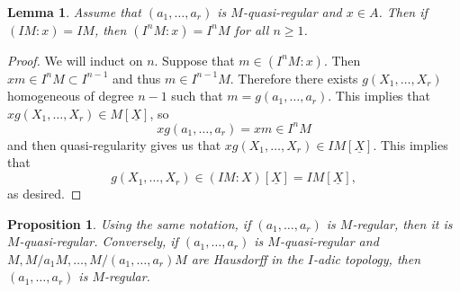 \documentclass[leqno, openany]{memoir}
\newtheorem{prop}[thm]{Proposition}
\newtheorem{lem}[thm]{Lemma}
\theoremstyle{definition}
\theoremstyle{remark}
\theoremstyle{plain}
\theoremstyle{definition}
\theoremstyle{remark}
\newcommand{\ul}[1]{\underline{#1}}
\begin{document}
\begin{lem} Assume that $(a_1, \ldots, a_r)$ is $M$-quasi-regular and $x \in
A$. Then if $(IM : x) = IM$, then $(I^n M : x) = I^n M$ for all $n \geq 1$.
\end{lem}

\begin{proof} We will induct on $n$. Suppose that $m \in (I^n M : x)$. Then $xm
    \in I^n M \subset I^{n-1}$ and thus $m \in I^{n-1}M$. Therefore there
    exists $g(X_1, \ldots, X_r)$ homogeneous of degree $n-1$ such that $m =
    g(a_1, \ldots, a_r)$. This implies that $x g(X_1, \ldots, X_r) \in
    M[\ul{X}]$, so \[ xg(a_1, \ldots, a_r) = xm \in I^n M \] and then
    quasi-regularity gives us that $xg(X_1, \ldots, X_r) \in IM[\ul{X}]$. This
    implies that \[ g(X_1, \ldots, X_r) \in (IM : X)[\ul{X}] = IM[\ul{X}], \]
as desired.  \end{proof}

\begin{prop} Using the same notation, if $(a_1, \ldots, a_r)$ is $M$-regular,
    then it is $M$-quasi-regular. Conversely, if $(a_1, \ldots, a_r)$ is
    $M$-quasi-regular and $M, M/a_1 M, \ldots, M/(a_1, \ldots, a_r)M$ are
    Hausdorff in the $I$-adic topology, then $(a_1, \ldots, a_r)$ is
    $M$-regular.  \end{prop}
\end{document}
